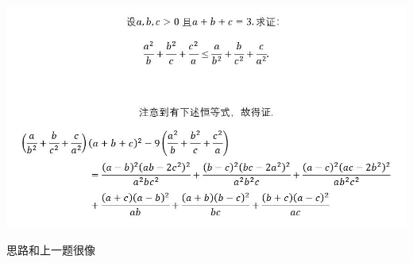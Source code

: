 \documentclass[UTF8]{ctexart}
\begin{document}
\subsection{}
\begin{center}
	\includegraphics[width=1\linewidth]{a16}
\end{center}
思路和上一题很像
\end{document}
